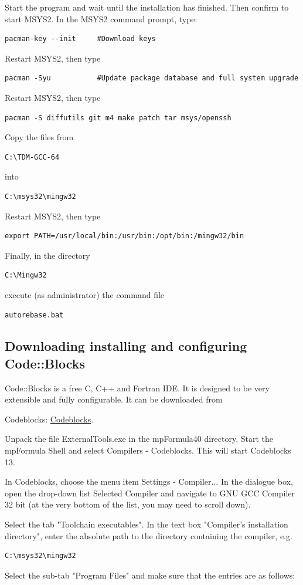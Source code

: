 \vpara
Start the program and wait until the installation has finished. Then confirm to start MSYS2. In the MSYS2 command prompt, type:
\begin{verbatim}
pacman-key --init     #Download keys
\end{verbatim}
Restart MSYS2, then type
\begin{verbatim}
pacman -Syu           #Update package database and full system upgrade
\end{verbatim}
Restart MSYS2, then type
\begin{verbatim}
pacman -S diffutils git m4 make patch tar msys/openssh
\end{verbatim}
Copy the files from 
\begin{verbatim}
C:\TDM-GCC-64
\end{verbatim}
into
\begin{verbatim}
C:\msys32\mingw32
\end{verbatim}
Restart MSYS2, then type
\begin{verbatim}
export PATH=/usr/local/bin:/usr/bin:/opt/bin:/mingw32/bin
\end{verbatim}
Finally, in the directory 
\begin{verbatim}
C:\Mingw32
\end{verbatim}
execute (as administrator) the command file  
\begin{verbatim}
autorebase.bat
\end{verbatim}



\subsection{Downloading installing and configuring Code::Blocks}

Code::Blocks is a free C, C++ and Fortran IDE. It is designed to be very extensible and fully configurable. It can be downloaded from

Codeblocks: \href{http://www.codeblocks.org/home}{Codeblocks}.


Unpack the file ExternalTools.exe in the mpFormula40 directory. Start the mpFormula Shell and select Compilers - Codeblocks. This will start Codeblocks 13.

In Codeblocks, choose the menu item Settings - Compiler... In the dialogue box, open the drop-down list Selected Compiler and navigate to GNU GCC Compiler 32 bit (at the very bottom of the list, you may need to scroll down).

Select the tab "Toolchain executables". In the text box "Compiler's installation directory", enter the absolute path to the directory containing the compiler, e.g.
\begin{verbatim}
C:\msys32\mingw32
\end{verbatim}
Select the sub-tab "Program Files" and make sure that the entries are as follows:

